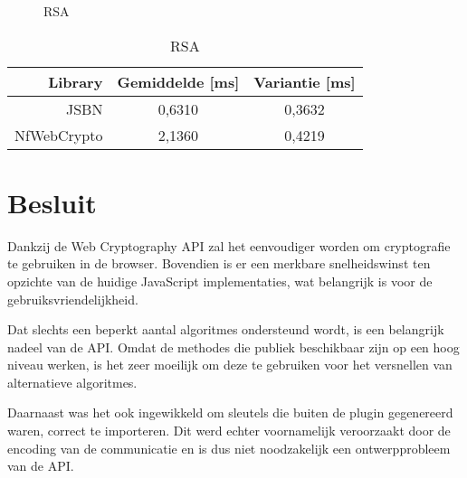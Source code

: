 \begin{figure}
  \caption{RSA}
  \label{fig:wc:rsa}
\end{figure}

\begin{table}
  \begin{center}
    \caption{RSA}
    \label{tab:wc:rsa}
    \begin{tabular}{r | c c}
      Library & Gemiddelde [ms] & Variantie [ms] \\ \hline
      JSBN & 0,6310 & 0,3632  \\
      NfWebCrypto & 2,1360 & 0,4219
    \end{tabular}
  \end{center}
\end{table}

\section{Besluit}

Dankzij de Web Cryptography API zal het eenvoudiger worden om cryptografie te gebruiken in de browser. Bovendien is er een merkbare snelheidswinst ten opzichte van de huidige JavaScript implementaties, wat belangrijk is voor de gebruiksvriendelijkheid. 

\npar Dat slechts een beperkt aantal algoritmes ondersteund wordt, is een belangrijk nadeel van de API. Omdat de methodes die publiek beschikbaar zijn op een hoog niveau werken, is het zeer moeilijk om deze te gebruiken voor het versnellen van alternatieve algoritmes.

\npar Daarnaast was het ook ingewikkeld om sleutels die buiten de plugin gegenereerd waren, correct te importeren. Dit werd echter voornamelijk veroorzaakt door de encoding van de communicatie en is dus niet noodzakelijk een ontwerpprobleem van de API.
